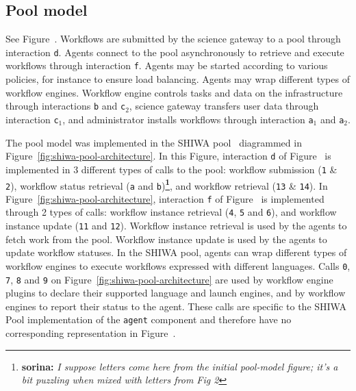 \documentclass[preprint,3p,twocolumn]{elsarticle}
\newcommand{\note}[2]{\textbf{\Large{\color{blue}\footnote{{\color{blue}\textbf{#1:} \textit{#2}\color{black}}}}}}
\begin{document}
\subsection{Pool model}
\label{sec:pool}
See Figure~. Workflows are submitted by the science
gateway to a pool through interaction \texttt{d}. Agents connect to
the pool asynchronously to retrieve and execute workflows through
interaction \texttt{f}. Agents may be started according to various
policies, for instance to ensure load balancing. Agents may wrap
different types of workflow engines. Workflow engine controls tasks
and data on the infrastructure through interactions \texttt{b} and
\texttt{c$_2$}, science gateway transfers user data through
interaction \texttt{c$_1$}, and administrator installs workflows
through interaction \texttt{a$_1$} and \texttt{a$_2$}.

The pool model was implemented in the SHIWA pool~\cite{ROGE-13}
diagrammed in Figure~\ref{fig:shiwa-pool-architecture}. In this
Figure, interaction \texttt{d} of Figure~ is
implemented in 3 different types of calls to the pool: workflow
submission (\texttt{1} \& \texttt{2}), workflow status retrieval
(\texttt{a} and \texttt{b})\note{sorina}{I suppose letters come here 
from the initial pool-model figure; it's a bit puzzling when mixed with 
letters from Fig 2}, and workflow retrieval (\texttt{13} \&
\texttt{14}). In Figure~\ref{fig:shiwa-pool-architecture},
interaction \texttt{f} of Figure~ is implemented
through 2 types of calls: workflow instance retrieval (\texttt{4},
\texttt{5} and \texttt{6}), and workflow instance update (\texttt{11}
and \texttt{12}). Workflow instance retrieval is used by the agents to
fetch work from the pool. Workflow instance update is used by the
agents to update workflow statuses. In the SHIWA pool, agents can wrap
different types of workflow engines to execute workflows expressed
with different languages. Calls \texttt{0}, \texttt{7}, \texttt{8} and
\texttt{9} on Figure~\ref{fig:shiwa-pool-architecture} are used by
workflow engine plugins to declare their supported language and launch
engines, and by workflow engines to report their status to the
agent. These calls are specific to the SHIWA Pool implementation of
the \texttt{agent} component and therefore have no corresponding
representation in Figure~.
\end{document}

